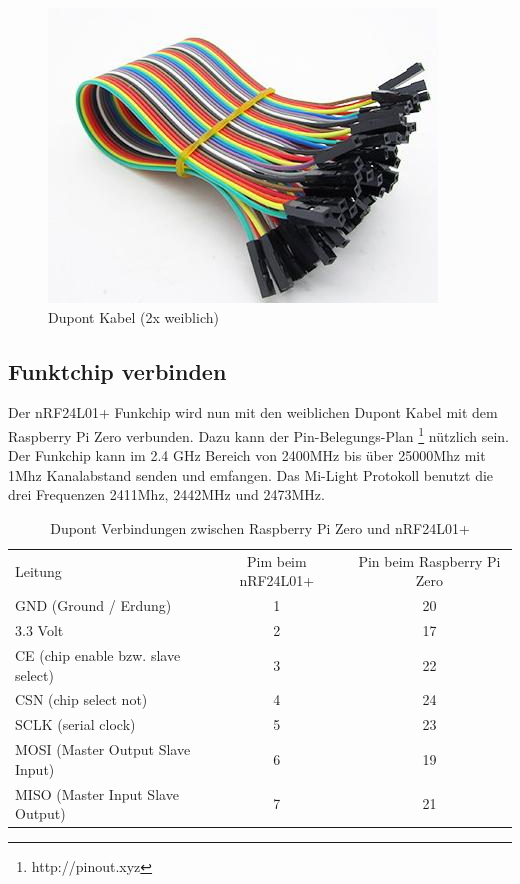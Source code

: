 \begin{figure}[h]
\begin{minipage}[t]{0.3\textwidth}
		\includegraphics[width=\linewidth]{dupont_female}
		\caption{Dupont Kabel (2x weiblich)}
	\end{minipage}
\end{figure}


\subsection{Funktchip verbinden}
Der nRF24L01+ Funkchip wird nun mit den weiblichen Dupont Kabel mit dem Raspberry Pi Zero verbunden. Dazu kann der Pin-Belegungs-Plan \footnote{http://pinout.xyz} nützlich sein. Der Funkchip kann im 2.4 GHz Bereich von 2400MHz bis über 25000Mhz mit 1Mhz Kanalabstand senden und emfangen. Das Mi-Light Protokoll benutzt die drei Frequenzen 2411Mhz, 2442MHz und 2473MHz. 
\begin{table}[h]
\centering
\begin{tabu} to \linewidth {l c c}
	\toprule
	Leitung & Pim beim nRF24L01+ & Pin beim Raspberry Pi Zero \\
	GND (Ground / Erdung) & 1 & 20 \\
	3.3 Volt & 2 & 17 \\
	CE (chip enable bzw. slave select) & 3 & 22 \\
	CSN (chip select not) & 4 & 24 \\
	SCLK (serial clock) & 5 & 23 \\ 
	MOSI (Master Output Slave Input) & 6 & 19 \\
	MISO (Master Input Slave Output) & 7 & 21 \\
	\bottomrule
	\end{tabu}
	\caption{Dupont Verbindungen zwischen Raspberry Pi Zero und nRF24L01+}
\end{table}


